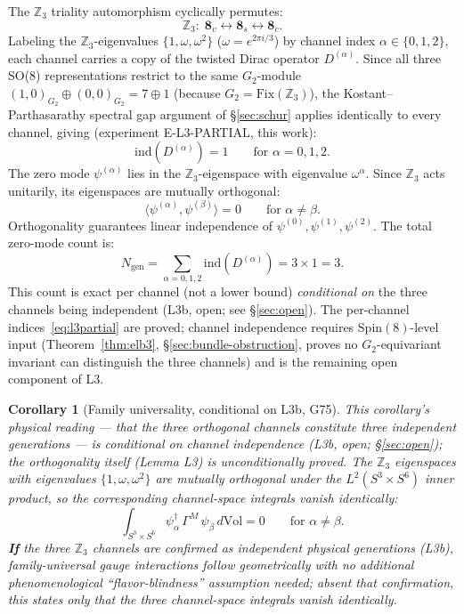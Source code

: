 \documentclass[12pt,a4paper]{article}
\newcommand{\ind}{\mathrm{ind}}
\newcommand{\ZZ}{\mathbb{Z}}
\newtheorem{corollary}[lemma]{Corollary}
\begin{document}
The $\ZZ_3$ triality automorphism cyclically permutes:
\begin{equation}
  \ZZ_3:\; \mathbf{8}_v \leftrightarrow \mathbf{8}_s \leftrightarrow \mathbf{8}_c.
\end{equation}
Labeling the $\ZZ_3$-eigenvalues $\{1,\omega,\omega^2\}$ ($\omega=e^{2\pi i/3}$) by channel
index $\alpha\in\{0,1,2\}$, each channel carries a copy of the twisted Dirac operator
$D^{(\alpha)}$.
Since all three SO(8) representations restrict to the same $G_2$-module
$(1,0)_{G_2}\oplus(0,0)_{G_2}=7\oplus 1$ (because $G_2=\mathrm{Fix}(\ZZ_3)$),
the Kostant--Parthasarathy spectral gap argument of \S\ref{sec:schur} applies identically
to every channel, giving (experiment E-L3-PARTIAL, this work):
\begin{equation}
  \ind(D^{(\alpha)}) = 1 \qquad\text{for } \alpha=0,1,2.
  \label{eq:l3partial}
\end{equation}
The zero mode $\psi^{(\alpha)}$ lies in the $\ZZ_3$-eigenspace with eigenvalue $\omega^\alpha$.
Since $\ZZ_3$ acts unitarily, its eigenspaces are mutually orthogonal:
\begin{equation}
  \langle\psi^{(\alpha)},\psi^{(\beta)}\rangle = 0 \qquad\text{for } \alpha\neq\beta.
  \tag{Lemma L3}
\end{equation}
Orthogonality guarantees linear independence of $\psi^{(0)},\psi^{(1)},\psi^{(2)}$. The total
zero-mode count is:
\begin{equation}
  \boxed{N_{\mathrm{gen}} = \sum_{\alpha=0,1,2}\ind(D^{(\alpha)}) = 3\times 1 = 3.}
\end{equation}
This count is exact per channel (not a lower bound) \emph{conditional on} the three
channels being independent (L3b, open; see \S\ref{sec:open}).
The per-channel indices~\eqref{eq:l3partial} are proved; channel independence requires
$\mathrm{Spin}(8)$-level input (Theorem~\ref{thm:elb3}, \S\ref{sec:bundle-obstruction},
proves no $G_2$-equivariant invariant can distinguish the three channels) and is the
remaining open component of L3.

\begin{corollary}[Family universality, conditional on L3b, G75]
This corollary's physical reading --- that the three orthogonal channels constitute
three independent generations --- is conditional on channel independence (L3b, open;
\S\ref{sec:open}); the orthogonality itself (Lemma L3) is unconditionally proved.
The $\ZZ_3$ eigenspaces with eigenvalues $\{1,\omega,\omega^2\}$ are mutually orthogonal
under the $L^2(S^3\times S^6)$ inner product, so the corresponding channel-space integrals
vanish identically:
\begin{equation}
  \int_{S^3\times S^6} \psi_\alpha^\dagger\,\Gamma^M\,\psi_\beta\,d\mathrm{Vol} = 0
  \qquad\text{for } \alpha\neq\beta.
\end{equation}
\textbf{If} the three $\ZZ_3$ channels are confirmed as independent physical generations
(L3b), family-universal gauge interactions follow geometrically with no additional
phenomenological ``flavor-blindness'' assumption needed; absent that confirmation, this
states only that the three channel-space integrals vanish identically.
\end{corollary}
\end{document}
